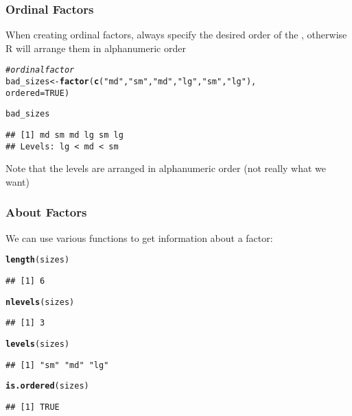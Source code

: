\documentclass[12pt]{beamer}\usepackage[]{graphicx}\usepackage[]{color}
\makeatletter
\newcommand{\hlnum}[1]{\textcolor[rgb]{0.686,0.059,0.569}{#1}}%
\newcommand{\hlstr}[1]{\textcolor[rgb]{0.192,0.494,0.8}{#1}}%
\newcommand{\hlcom}[1]{\textcolor[rgb]{0.678,0.584,0.686}{\textit{#1}}}%
\newcommand{\hlstd}[1]{\textcolor[rgb]{0.345,0.345,0.345}{#1}}%
\newcommand{\hlkwb}[1]{\textcolor[rgb]{0.69,0.353,0.396}{#1}}%
\newcommand{\hlkwc}[1]{\textcolor[rgb]{0.333,0.667,0.333}{#1}}%
\newcommand{\hlkwd}[1]{\textcolor[rgb]{0.737,0.353,0.396}{\textbf{#1}}}%
\newenvironment{kframe}{%
 \def\at@end@of@kframe{}%
 \ifinner\ifhmode%
  \def\at@end@of@kframe{\end{minipage}}%
  \begin{minipage}{\columnwidth}%
 \fi\fi%
 \def\FrameCommand##1{\hskip\@totalleftmargin \hskip-\fboxsep
 \colorbox{shadecolor}{##1}\hskip-\fboxsep
     \hskip-\linewidth \hskip-\@totalleftmargin \hskip\columnwidth}%
 \MakeFramed {\advance\hsize-\width
   \@totalleftmargin\z@ \linewidth\hsize
   \@setminipage}}%
 {\par\unskip\endMakeFramed%
 \at@end@of@kframe}
\newenvironment{knitrout}{}{} %
\makeatother
\begin{document}

\begin{frame}[fragile]
\frametitle{Ordinal Factors}

When creating ordinal factors, always specify the desired order of the , otherwise R will arrange them in alphanumeric order
\begin{knitrout}\footnotesize
{}\color{fgcolor}\begin{kframe}
\begin{alltt}
\hlcom{# ordinal factor}
\hlstd{bad_sizes} \hlkwb{<-} \hlkwd{factor}\hlstd{(}\hlkwd{c}\hlstd{(}\hlstr{"md"}\hlstd{,} \hlstr{"sm"}\hlstd{,} \hlstr{"md"}\hlstd{,} \hlstr{"lg"}\hlstd{,} \hlstr{"sm"}\hlstd{,} \hlstr{"lg"}\hlstd{),}
                \hlkwc{ordered} \hlstd{=} \hlnum{TRUE}\hlstd{)}

\hlstd{bad_sizes}
\end{alltt}
\begin{verbatim}
## [1] md sm md lg sm lg
## Levels: lg < md < sm
\end{verbatim}
\end{kframe}
\end{knitrout}
Note that the levels are arranged in alphanumeric order (not really what we want)

\end{frame}


\begin{frame}[fragile]
\frametitle{About Factors}

We can use various functions to get information about a factor:
\begin{knitrout}\footnotesize
{}\color{fgcolor}\begin{kframe}
\begin{alltt}
\hlkwd{length}\hlstd{(sizes)}
\end{alltt}
\begin{verbatim}
## [1] 6
\end{verbatim}
\begin{alltt}
\hlkwd{nlevels}\hlstd{(sizes)}
\end{alltt}
\begin{verbatim}
## [1] 3
\end{verbatim}
\begin{alltt}
\hlkwd{levels}\hlstd{(sizes)}
\end{alltt}
\begin{verbatim}
## [1] "sm" "md" "lg"
\end{verbatim}
\begin{alltt}
\hlkwd{is.ordered}\hlstd{(sizes)}
\end{alltt}
\begin{verbatim}
## [1] TRUE
\end{verbatim}
\end{kframe}
\end{knitrout}

\end{frame}
\end{document}
